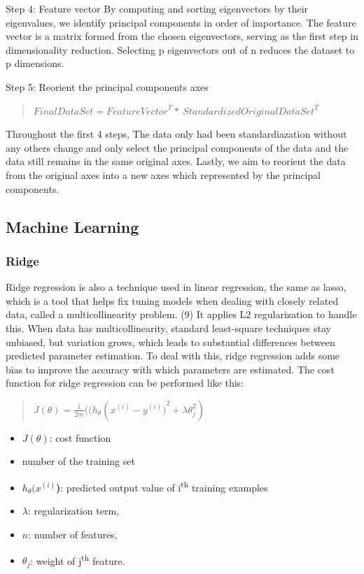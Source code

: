 Step 4: Feature vector
By computing and sorting eigenvectors by their eigenvalues, we identify principal components in order of importance. The feature vector is a matrix formed from the chosen eigenvectors, serving as the first step in dimensionality reduction. Selecting p eigenvectors out of n reduces the dataset to p dimensions. 

Step 5: Reorient the principal components axes

\begin{quote}
    \(FinalDataSet = {FeatureVector}^{T}*\ {StandardizedOriginalDataSet}^{T}\)
\end{quote}
Throughout the first 4 steps, The data only had been standardiazation without any others change and only select the principal components of the data and the data still remains in the same original axes.
Lastly, we aim to reorient the data from the original axes into a new axes which represented by the principal components.

\subsection{Machine Learning}

\subsubsection{Ridge}
Ridge regression is also a technique used in linear regression, the same as lasso, which is a tool that helps fix tuning models when dealing with closely related data, called a multicollinearity problem. (9) It applies L2 regularization to handle this. When data has multicollinearity, standard least-square techniques stay unbiased, but variation grows, which leads to substantial differences between predicted parameter estimation. To deal with this, ridge regression adds some bias to improve the accuracy with which parameters are estimated.
The cost function for ridge regression can be performed like this: 
\begin{quote}
    
    \(J(\theta) = \frac{1}{2m}((h_{\theta}(x^{(i)} - {y^{(i)})}^{2} + \lambda\theta_{j}^{2})\)
\end{quote}
    
\begin{itemize}
    \item \(J(\theta)\): cost function
    \item number of the training set
    \item \(h_{\theta}(x^{(i)}\)\textbf{)}: predicted output value of
    i\textsuperscript{th} training examples
    \item \(\lambda\): regularization term,
    \item \(n\): number of features,
    \item \(\theta_{j}\): weight of j\textsuperscript{th} feature.

\end{itemize}

